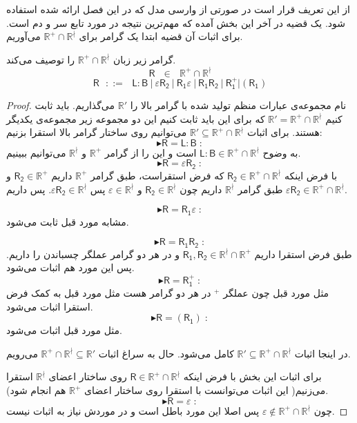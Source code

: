 از این تعریف قرار است در صورتی از وارسی مدل که در این فصل ارائه شده استفاده شود. یک قضیه در آخر این بخش آمده که مهم‌ترین نتیجه در مورد تابع سر و دم است. 
برای اثبات آن قضیه ابتدا یک گرامر برای $\mathbb{R^+ \cap R^\nmid}$ می‌آوریم.
\begin{thm}
	گرامر زیر زبان $\mathbb{R^+ \cap R^\nmid}$ را توصیف می‌کند.
	$$\mathsf{R} \:\:\:\in\:\:\: \mathbb{R^+ \cap R^\nmid}$$
	$$\mathsf{R}\:\:\: ::= \:\:\: \mathsf{L:B} \: |
	\: \mathsf{\varepsilon R_2} \: | \: \mathsf{R_1 \varepsilon} \: |
	\: \mathsf{R_1 R_2} \: | 
	\: \mathsf{R_1^+} | (\mathsf{R_1})$$
\end{thm}
\begin{proof}
	نام مجموعه‌ی عبارات منظم تولید شده با گرامر بالا را $\mathbb{R'}$ می‌گذاریم. باید ثابت کنیم
	$\mathbb{R'=R^+ \cap R^\nmid}$
	که برای این باید ثابت کنیم این دو مجموعه زیر مجموعه‌ی یکدیگر هستند. برای اثبات 
	$\mathbb{R' \subseteq R^+ \cap R^\nmid}$
	می‌توانیم روی ساختار گرامر بالا استقرا ‌بزنیم:
	$$\blacktriangleright \mathsf{R=L:B}\;:$$
	به وضوح 
	$\mathsf{L:B} \in \mathbb{R^+ \cap R^\nmid}$
	است و این را از گرامر $\mathbb{R^+}$ و $\mathbb{R^\nmid}$ می‌توانیم ببینیم.
	$$\blacktriangleright \mathsf{R=\varepsilon R_2}\;:$$
	با فرض اینکه 
	$\mathsf{R_2} \in \mathbb{R^+ \cap R^\nmid}$
	که فرض استقراست، طبق گرامر $\mathbb{R^+}$ داریم $\mathsf{R_2} \in \mathbb{R^+}$ و طبق گرامر $\mathbb{R^\nmid}$ داریم چون 
	$\mathsf{R_2} \in \mathbb{R^\nmid}$
	و
	$\varepsilon \in \mathbb{R^\nmid}$
	پس 
	$\mathsf{\varepsilon R_2} \in \mathbb{R^\nmid}$.
	پس داریم 
	$\mathsf{\varepsilon R_2} \in \mathbb{R^+ \cap R^\nmid}$.
	
	$$\blacktriangleright \mathsf{R=R_1 \varepsilon}\;:$$
	مشابه مورد قبل ثابت می‌شود.
	
	$$\blacktriangleright \mathsf{R=R_1 R_2}\;:$$
	طبق فرض استقرا داریم 
	$\mathsf{R_1,R_2} \in \mathbb{R^\nmid \cap R^+}$ 
	و در هر دو گرامر عملگر چسباندن را داریم. پس این مورد هم اثبات می‌شود.
	$$\blacktriangleright \mathsf{R=R_1^+}\;:$$
	مثل مورد قبل چون عملگر $ ^+$ در هر دو گرامر هست مثل مورد قبل به کمک فرض استقرا اثبات می‌شود.
	$$\blacktriangleright \mathsf{R=(R_1)}\;:$$
	مثل مورد قبل اثبات می‌شود.
	
	در اینجا اثبات 
	$\mathbb{R' \subseteq R^+ \cap R^\nmid}$ 
	کامل می‌شود. حال به سراغ اثبات 
	$\mathbb{R^+ \cap R^\nmid \subseteq R'}$
	می‌رویم.
	
	برای اثبات این بخش با فرض اینکه 
	$\mathsf{R} \in \mathbb{R^+ \cap R^\nmid}$
	روی ساختار اعضای $\mathbb{R^\nmid}$ استقرا می‌زنیم( این اثبات می‌توانست با استقرا روی ساختار اعضای $\mathbb{R^+}$ هم انجام شود).
	$$\blacktriangleright \mathsf{R=\varepsilon}\;:$$
	چون $\varepsilon \notin \mathbb{R^+ \cap R^\nmid}$ پس اصلا این مورد باطل است و در موردش نیاز به اثبات نیست.
	

\end{proof}

